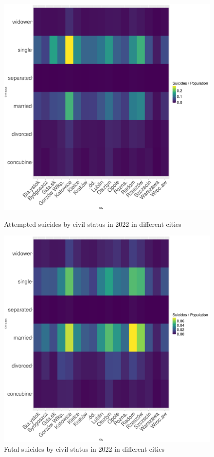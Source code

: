 \documentclass{article}
\begin{document}
\begin{figure}[H]
    \centering
    \begin{minipage}{0.55\textwidth}
        \includegraphics[width=\textwidth]{imgs/status_city_op-att-2022.pdf}
        \caption{Attempted suicides by civil status  in 2022 in different cities}
	\label{fig:status_city_op-att-2022}
    \end{minipage}
    \hfill
    \begin{minipage}{0.55\textwidth}
        \includegraphics[width=\textwidth]{imgs/status_city_op-fat-2022.pdf}
        \caption{Fatal suicides by civil status  in 2022 in different cities}
        \label{fig:status_city_op-fat-2022}
    \end{minipage}
\end{figure}
\end{document}
